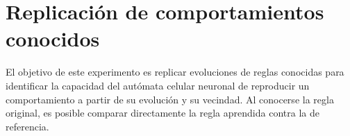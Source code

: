 \section{Replicación de comportamientos conocidos}\label{sec:exp1}

El objetivo de este experimento es replicar evoluciones de reglas conocidas para identificar la capacidad del autómata celular neuronal de reproducir un comportamiento a partir de su evolución y su vecindad. Al conocerse la regla original, es posible comparar directamente la regla aprendida contra la de referencia.
